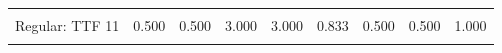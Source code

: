\documentclass[
  10pt,
]{scrartcl}
\begin{document}
\begin{table}[H]
{\begin{tabular}[t]{lrrrrrrrr}
\cellcolor{gray!6}{DepthB: T123T145 11} & \cellcolor{gray!6}{0.331} & \cellcolor{gray!6}{0.331} & \cellcolor{gray!6}{0.996} & \cellcolor{gray!6}{0.996} & \cellcolor{gray!6}{-0.047} & \cellcolor{gray!6}{-0.003} & \cellcolor{gray!6}{-0.003} & \cellcolor{gray!6}{-0.004}\\
Regular: TTF 11 & 0.500 & 0.500 & 3.000 & 3.000 & 0.833 & 0.500 & 0.500 & 1.000\\
\cellcolor{gray!6}{Dodecahedron: TTF 11} & \cellcolor{gray!6}{0.500} & \cellcolor{gray!6}{0.500} & \cellcolor{gray!6}{6.000} & \cellcolor{gray!6}{6.000} & \cellcolor{gray!6}{0.917} & \cellcolor{gray!6}{0.625} & \cellcolor{gray!6}{0.625} & \cellcolor{gray!6}{1.000}\\
\bottomrule
\end{tabular}}
\end{table}
\end{document}
